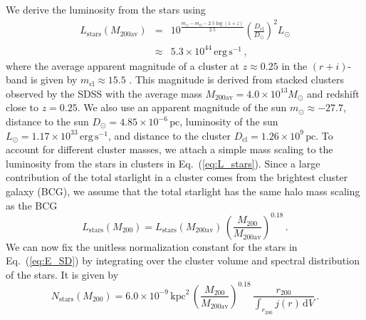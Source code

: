 \documentclass[10pt,aps,pra,reprint,amsmath,amsfonts,amssymb,showpacs,nofootinbib,floatfix]{revtex4-1}
\def\del#1{{}}
\newcommand{\rmn}{\mathrm}
\newcommand{\clu}{\rmn{cl}}
\newcommand{\msun}{M_\odot}
\newcommand{\stars}{\rmn{stars}}
\newcommand{\kpc}{\rmn{kpc}}
\newcommand{\dd}{\rmn{d}}
\newcommand{\rvir}{r_{200}}
\newcommand{\mvir}{M_{200}}
\begin{document}
We derive the luminosity from the stars using
\begin{eqnarray}
L_\stars(M_{200\rmn{av}})&=&10^{\frac{m_\odot-m_\rmn{cl}-2.5\log\left(1+z\right)}{2.5}}
\left(\frac{D_\clu}{D_\odot}\right)^2 L_\odot\nonumber\\
&\approx& 5.3\times10^{44}\,\rmn{erg}\,\rmn{s}^{-1}\,,
\label{eq:L_stars}
\end{eqnarray}
where the average apparent magnitude of a cluster at $z\approx 0.25$
in the $(r+i)$-band is given by $m_\rmn{cl}\approx 15.5$
\cite{2005MNRAS.358..949Z}. This magnitude is derived from stacked
clusters observed by the SDSS with the average mass
$M_{200\rmn{av}}=4.0\times10^{13}\msun$ and redshift close to
$z=0.25$. We also use an apparent magnitude of the sun $m_\odot\approx
-27.7$, distance to the sun $D_\odot=4.85\times10^{-6}\,\rmn{pc}$,
luminosity of the sun $L_\odot=1.17\times10^{33}\,\rmn{erg\,s}^{-1}$,
and distance to the cluster $D_\clu=1.26\times10^9\,\rmn{pc}$. To
account for different cluster masses, we attach a simple mass scaling
to the luminosity from the stars in clusters in Eq.~(\ref{eq:L_stars}).
Since a large contribution of the total starlight in a cluster comes
from the brightest cluster galaxy (BCG), we assume that the total
starlight has the same halo mass scaling as the BCG
\cite{2010ApJ...713.1037H}
\begin{equation}
L_\stars(\mvir)=L_\stars(M_{200\rmn{av}})\,
\left(\frac{\mvir}{M_{200\rmn{av}}}\right)^{0.18}\,.
\label{eq:L_stars_m}
\end{equation} 
We can now fix the unitless normalization constant for the stars in
Eq.~(\ref{eq:E_SD}) by integrating over the cluster volume and
spectral distribution of the stars. It is given by
\begin{equation}
 N_\stars(\mvir) = 6.0\times10^{-9}\,\kpc^2\,
\left(\frac{\mvir}{M_{200\rmn{av}}}\right)^{0.18}\,
\frac{\rvir}{\int_{\rvir} j(r) \,\dd V}\,.
\label{eq:N_stars}
\end{equation}
\del{Note that since the luminosities include the contribution from
galaxies, we have integrated the spatial distribution including
galaxies to derive the normalization. Once the normalization is fixed,
the SD energy densities are derived from the spatial distribution
where galaxies have been excluded.}
\end{document}
